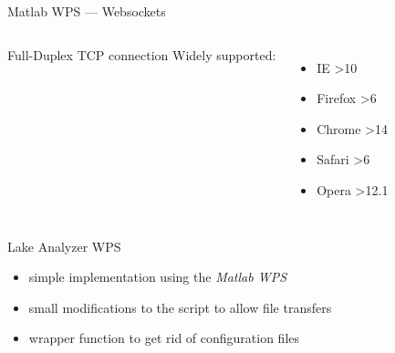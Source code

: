 \documentclass[xcolor=svgnames,professionalfonts,11pt,aspectratio=43,handout]{beamer}
\begin{document}

\begin{frame}[c,fragile]{Matlab WPS --- Websockets}
  \begin{columns}
    
    \pause
    
  \end{columns}
  \pause
  \begin{columns}
  Full-Duplex TCP connection
  \pause
  Widely supported:
  \begin{itemize}
    \item IE \textgreater10
    \item Firefox \textgreater6
    \item Chrome \textgreater14
    \item Safari \textgreater6
    \item Opera \textgreater12.1
  \end{itemize}
  \end{columns}
\end{frame}


\begin{frame}[t]{Lake Analyzer WPS}
  \begin{itemize}
    \item simple implementation using the \emph{Matlab WPS}
    \item small modifications to the script to allow file transfers
    \item wrapper function to get rid of configuration files
  \end{itemize}
\end{frame}
\end{document}
